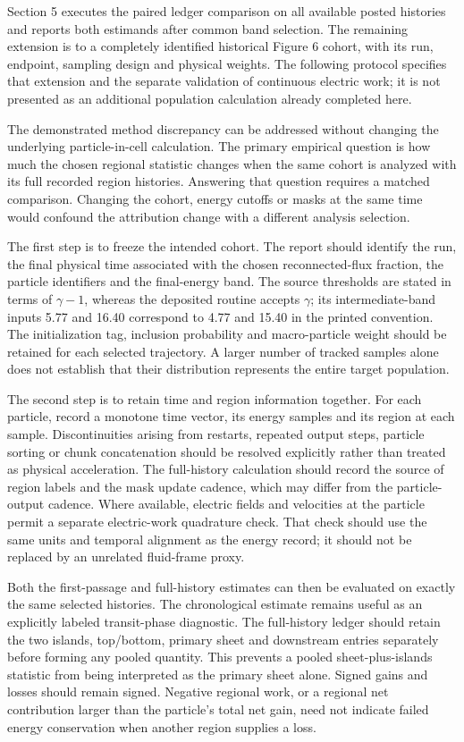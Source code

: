 Section 5 executes the paired ledger comparison on all available posted
histories and reports both estimands after common band selection. The
remaining extension is to a completely identified historical Figure 6
cohort, with its run, endpoint, sampling design and physical weights.
The following protocol specifies that extension and the separate
validation of continuous electric work; it is not presented as an
additional population calculation already completed here.

The demonstrated method discrepancy can be addressed without changing
the underlying particle-in-cell calculation. The primary empirical
question is how much the chosen regional statistic changes when the same
cohort is analyzed with its full recorded region histories. Answering
that question requires a matched comparison. Changing the cohort, energy
cutoffs or masks at the same time would confound the attribution change
with a different analysis selection.

The first step is to freeze the intended cohort. The report should
identify the run, the final physical time associated with the chosen
reconnected-flux fraction, the particle identifiers and the final-energy
band. The source thresholds are stated in terms of \(\gamma-1\), whereas
the deposited routine accepts \(\gamma\); its intermediate-band inputs
5.77 and 16.40 correspond to 4.77 and 15.40 in the printed convention.
The initialization tag, inclusion probability and macro-particle weight
should be retained for each selected trajectory. A larger number of
tracked samples alone does not establish that their distribution
represents the entire target population.

The second step is to retain time and region information together. For
each particle, record a monotone time vector, its energy samples and its
region at each sample. Discontinuities arising from restarts, repeated
output steps, particle sorting or chunk concatenation should be resolved
explicitly rather than treated as physical acceleration. The
full-history calculation should record the source of region labels and
the mask update cadence, which may differ from the particle-output
cadence. Where available, electric fields and velocities at the particle
permit a separate electric-work quadrature check. That check should use
the same units and temporal alignment as the energy record; it should
not be replaced by an unrelated fluid-frame proxy.

Both the first-passage and full-history estimates can then be evaluated
on exactly the same selected histories. The chronological estimate
remains useful as an explicitly labeled transit-phase diagnostic. The
full-history ledger should retain the two islands, top/bottom, primary
sheet and downstream entries separately before forming any pooled
quantity. This prevents a pooled sheet-plus-islands statistic from being
interpreted as the primary sheet alone. Signed gains and losses should
remain signed. Negative regional work, or a regional net contribution
larger than the particle's total net gain, need not indicate failed
energy conservation when another region supplies a loss.

